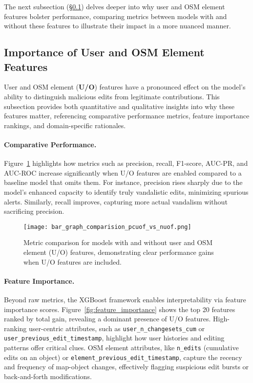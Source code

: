 \documentclass[
    13pt, %
    a4paper, %
    DIV14, %
    listof=totoc, %
    bibliography=totoc, %
    index=totoc, %
    headsepline
]{scrreprt}
\begin{document}
The next subsection (\S\ref{sec:importance_user_features}) delves deeper into why user and OSM element features bolster performance, comparing metrics between models with and without these features to illustrate their impact in a more nuanced manner.

\subsection{Importance of User and OSM Element Features}
\label{sec:importance_user_features}

User and OSM element (\textbf{U/O}) features have a pronounced effect on the model’s ability to distinguish malicious edits from legitimate contributions. This subsection provides both quantitative and qualitative insights into why these features matter, referencing comparative performance metrics, feature importance rankings, and domain-specific rationales.

\paragraph{Comparative Performance.}
Figure~\ref{fig:bar_graph_comparison} highlights how metrics such as precision, recall, F1-score, AUC-PR, and AUC-ROC increase significantly when U/O features are enabled compared to a baseline model that omits them. For instance, precision rises sharply due to the model’s enhanced capacity to identify truly vandalistic edits, minimizing spurious alerts. Similarly, recall improves, capturing more actual vandalism without sacrificing precision.

\begin{figure}[H]
    \centering
    \texttt{[image: bar\_graph\_comparision\_pcuof\_vs\_nuof.png]}
    \caption{Metric comparison for models with and without user and OSM element (U/O) features, demonstrating clear performance gains when U/O features are included.}
    \label{fig:bar_graph_comparison}
\end{figure}

\paragraph{Feature Importance.}
Beyond raw metrics, the XGBoost framework enables interpretability via feature importance scores. Figure~\ref{fig:feature_importance} shows the top 20 features ranked by total gain, revealing a dominant presence of U/O features. High-ranking user-centric attributes, such as \texttt{user\_n\_changesets\_cum} or \texttt{user\_previous\_edit\_timestamp}, highlight how user histories and editing patterns offer critical clues. OSM element attributes, like \texttt{n\_edits} (cumulative edits on an object) or \texttt{element\_previous\_edit\_timestamp}, capture the recency and frequency of map-object changes, effectively flagging suspicious edit bursts or back-and-forth modifications.
\end{document}
